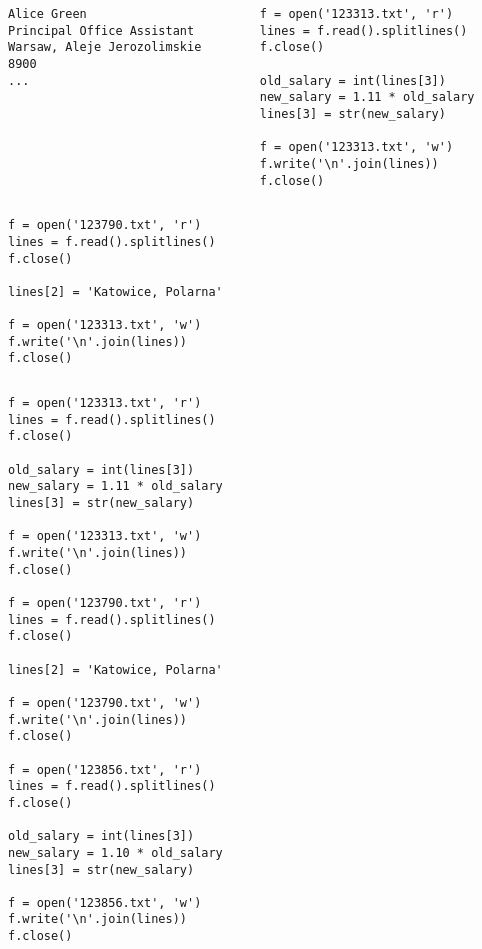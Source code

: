 \documentclass[aspectratio=169]{beamer}
\newcommand{\style}[1]{\ttfamily#1}
\begin{document}
\begin{frame}[fragile]
\begin{columns}
\begin{column}{0.5\textwidth}
\begin{verbatim}
Alice Green
Principal Office Assistant
Warsaw, Aleje Jerozolimskie
8900
...
\end{verbatim}
\end{column}
\begin{column}{0.5\textwidth}
\begin{lstlisting}
f = open('123313.txt', 'r')
lines = f.read().splitlines()
f.close()

old_salary = int(lines[3])
new_salary = 1.11 * old_salary
lines[3] = str(new_salary)

f = open('123313.txt', 'w')
f.write('\n'.join(lines))
f.close()
\end{lstlisting}
\end{column}
\end{columns}
\end{frame}

\begin{frame}[fragile]
\begin{lstlisting}
f = open('123790.txt', 'r')
lines = f.read().splitlines()
f.close()

lines[2] = 'Katowice, Polarna'

f = open('123313.txt', 'w')
f.write('\n'.join(lines))
f.close()
\end{lstlisting}
\end{frame}

\begin{frame}[fragile]
\begin{columns}
\begin{column}{0.5\textwidth}
\begin{lstlisting}[basicstyle=\style{\tiny}]
f = open('123313.txt', 'r')
lines = f.read().splitlines()
f.close()

old_salary = int(lines[3])
new_salary = 1.11 * old_salary
lines[3] = str(new_salary)

f = open('123313.txt', 'w')
f.write('\n'.join(lines))
f.close()

f = open('123790.txt', 'r')
lines = f.read().splitlines()
f.close()

lines[2] = 'Katowice, Polarna'

f = open('123790.txt', 'w')
f.write('\n'.join(lines))
f.close()

f = open('123856.txt', 'r')
lines = f.read().splitlines()
f.close()

old_salary = int(lines[3])
new_salary = 1.10 * old_salary
lines[3] = str(new_salary)

f = open('123856.txt', 'w')
f.write('\n'.join(lines))
f.close()
\end{lstlisting}
\end{column}
\begin{column}{0.5\textwidth}
\end{column}
\end{columns}
\end{frame}
\end{document}
